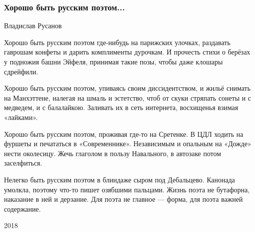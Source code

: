  
 
 

\subsubsection{Хорошо быть русским поэтом...}
\label{sec:poetry.rus.dnr.vladislav_rusanov.horosho_byt_russkim_poetom}

Владислав Русанов

Хорошо быть русским поэтом
где-нибудь на парижских улочках,
раздавать гаврошам конфеты
и дарить комплименты дурочкам.
И прочесть стихи о берёзах
у подножия башни Эйфеля,
принимая такие позы,
чтобы даже клошары сдрейфили.

Хорошо быть русским поэтом,
упиваясь своим диссидентством,
и жильё снимать на Манхэттене,
налегая на шмаль и эстетство,
чтоб от скуки стряпать сонеты
и с медведем, и с балалайкою.
Заливать их в сеть интернета,
восхищенья взимая «лайками».

Хорошо быть русским поэтом,
проживая где-то на Сретенке.
В ЦДЛ ходить на фуршеты
и печататься в «Современнике».
Независимым и опальным
на «Дожде» нести околесицу.
Жечь глаголом в пользу Навального,
в автозаке потом заселфиться.

Нелегко быть русским поэтом
в блиндаже сыром под Дебальцево.
Канонада умолкла, поэтому
что-то пишет озябшими пальцами.
Жизнь поэта не бутафорна,
наказание в ней и дерзание.
Для поэта не главное --- форма,
для поэта важней содержание.

2018
